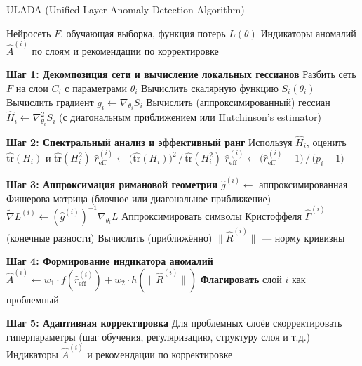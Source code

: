 \documentclass[a4paper,12pt]{article}
\begin{document}
\begin{algorithm}
\caption{ULADA (Unified Layer Anomaly Detection Algorithm)}
\label{alg:ulada}
\begin{algorithmic}[1]

\Require Нейросеть $F$, обучающая выборка, функция потерь $L(\theta)$
\Ensure Индикаторы аномалий $\hat{A}^{(i)}$ по слоям и рекомендации по корректировке

\Statex

\State \textbf{Шаг 1: Декомпозиция сети и вычисление локальных гессианов}
\State Разбить сеть $F$ на слои $C_i$ с параметрами $\theta_i$
  \State Вычислить скалярную функцию $S_i(\theta_i)$
  \State Вычислить градиент $g_i \gets \nabla_{\theta_i} S_i$
  \State Вычислить (аппроксимированный) гессиан $\hat{H}_i \gets \nabla^2_{\theta_i} S_i$ (с диагональным приближением или Hutchinson's estimator)
\EndFor

\Statex

\State \textbf{Шаг 2: Спектральный анализ и эффективный ранг}
  \State Используя $\hat{H}_i$, оценить $\widehat{\mathrm{tr}}(H_i)$ и $\widehat{\mathrm{tr}}(H_i^2)$
  \State $\widehat{r}_{\text{eff}}^{(i)} \gets \Big(\widehat{\mathrm{tr}}(H_i)\Big)^2 \,/\, \widehat{\mathrm{tr}}(H_i^2)$
  \State $\hat{r}_{\text{eff}}^{(i)} \gets \big(\widehat{r}_{\text{eff}}^{(i)} - 1\big)\,/\,\big(p_i - 1\big)$
\EndFor

\Statex

\State \textbf{Шаг 3: Аппроксимация римановой геометрии}
  \State $\hat{g}^{(i)} \gets$ аппроксимированная Фишерова матрица (блочное или диагональное приближение)
  \State $\tilde{\nabla} L^{(i)} \gets (\hat{g}^{(i)})^{-1} \nabla_{\theta_i} L$
  \State Аппроксимировать символы Кристоффеля $\hat{\Gamma}^{(i)}$ (конечные разности)
  \State Вычислить (приближённо) $\|\hat{R}^{(i)}\|$ --- норму кривизны
\EndFor

\Statex

\State \textbf{Шаг 4: Формирование индикатора аномалий}
  \State $\hat{A}^{(i)} \gets w_1 \cdot f(\hat{r}_{\text{eff}}^{(i)}) + w_2 \cdot h(\|\hat{R}^{(i)}\|)$
    \State \textbf{Флагировать} слой $i$ как проблемный
  \EndIf
\EndFor

\Statex

\State \textbf{Шаг 5: Адаптивная корректировка}
\State Для проблемных слоёв скорректировать гиперпараметры (шаг обучения, регуляризацию, структуру слоя и т.д.)
\State \Return Индикаторы $\hat{A}^{(i)}$ и рекомендации по корректировке

\end{algorithmic}
\end{algorithm}
\end{document}
